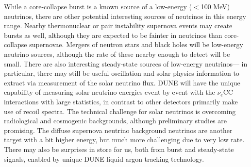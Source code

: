 While a core-collapse burst is a known source of a
low-energy ($<$100 MeV) neutrinos, there are other potential
interesting sources of neutrinos in this energy range.  Nearby
thermonuclear or pair instability supernova events may create bursts
as well, although they are expected to be fainter in neutrinos than
core-collapse supernovae.  Mergers of neutron stars and black holes
will be low-energy neutrino sources, although the rate of these nearby
enough to detect will be small.  There are also interesting
steady-state sources of low-energy neutrinos--- in particular, there
may still be useful oscillation and solar physics information to
extract via measurement of the solar neutrino flux. DUNE will have the
unique capability of measuring solar neutrino energies event by event
with the $\nu_e$CC interactions with large statistics, in contrast to
other detectors primarily make use of recoil spectra.  The technical
challenge for solar neutrinos is overcoming radiological and
cosmogenic backgrounds, although preliminary studies are promising.
The diffuse supernova neutrino background neutrinos are another target
with a bit higher energy, but much more challenging due to very low
rate.  There may also be surprises in store for us, both from burst
and steady-state signals, enabled by unique DUNE liquid argon tracking
technology.













